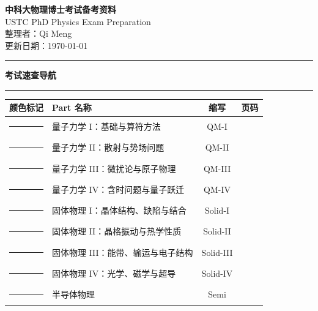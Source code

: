 



\begin{center}
{\Huge\bfseries\sffamily\color{ustcblue} 中科大物理博士考试备考资料}\\[8pt]
{\Large USTC PhD Physics Exam Preparation}\\[12pt]
{\large 整理者：Qi Meng}\\[4pt]
{\normalsize 更新日期：\today}
\end{center}

\vspace{8pt}
\textcolor{ustcblue}{\rule{\linewidth}{2pt}}
\vspace{8pt}

\begin{center}
{\LARGE\bfseries\color{ustcblue} 考试速查导航}\\[4pt]
\textcolor{ustcblue}{\rule{0.6\linewidth}{1.5pt}}
\end{center}

\vspace{6pt}
\begin{center}
\renewcommand{\arraystretch}{1.5}
\begin{tabular}{|c|l|c|c|}
\hline
\textbf{颜色标记} & \textbf{Part 名称} & \textbf{缩写} & \textbf{页码} \\
\hline
\textcolor{ustcblue}{\rule{8pt}{8pt}} & 量子力学 I：基础与算符方法 & QM-I & \pageref{part:qm1} \\
\hline
\textcolor{tealcolor}{\rule{8pt}{8pt}} & 量子力学 II：散射与势场问题 & QM-II & \pageref{part:qm2} \\
\hline
\textcolor{royalpurple}{\rule{8pt}{8pt}} & 量子力学 III：微扰论与原子物理 & QM-III & \pageref{part:qm3} \\
\hline
\textcolor{warnorange}{\rule{8pt}{8pt}} & 量子力学 IV：含时问题与量子跃迁 & QM-IV & \pageref{part:qm4} \\
\hline
\textcolor{successgreen}{\rule{8pt}{8pt}} & 固体物理 I：晶体结构、缺陷与结合 & Solid-I & \pageref{part:solid1} \\
\hline
\textcolor{alertred}{\rule{8pt}{8pt}} & 固体物理 II：晶格振动与热学性质 & Solid-II & \pageref{part:solid2} \\
\hline
\textcolor{USTCBLUE!80!black}{\rule{8pt}{8pt}} & 固体物理 III：能带、输运与电子结构 & Solid-III & \pageref{part:solid3} \\
\hline
\textcolor{solidbrown}{\rule{8pt}{8pt}} & 固体物理 IV：光学、磁学与超导 & Solid-IV & \pageref{part:solid4} \\
\hline
\textcolor{semigold}{\rule{8pt}{8pt}} & 半导体物理 & Semi & \pageref{part:semi} \\
\hline
\end{tabular}
\end{center}

